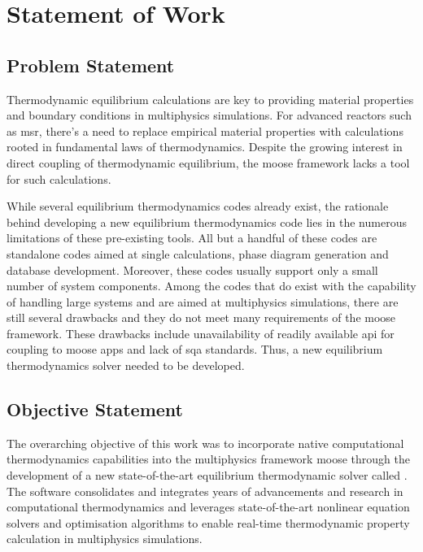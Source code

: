 \chapter{Statement of Work} \label{chap:overview}
	
\section{Problem Statement}
    Thermodynamic equilibrium calculations are key to providing material properties and boundary conditions in multiphysics simulations. For advanced reactors such as \gls{msr}, there's a need to replace empirical material properties with calculations rooted in fundamental laws of thermodynamics.  Despite the growing interest in direct coupling of thermodynamic equilibrium, the \gls{moose} framework lacks a tool for such calculations.

    While several equilibrium thermodynamics codes already exist, the rationale behind developing a new equilibrium thermodynamics code lies in the numerous limitations of these pre-existing tools. All but a handful of these codes are standalone codes aimed at single calculations, phase diagram generation and database development. Moreover, these codes usually support only a small number of system components. Among the codes that do exist with the capability of handling large systems and are aimed at multiphysics simulations, there are still several drawbacks and they do not meet many requirements of the \gls{moose} framework. These drawbacks include unavailability of readily available \gls{api} for coupling to \gls{moose} apps and lack of \gls{sqa} standards. Thus, a new equilibrium thermodynamics solver needed to be developed.

\section{Objective Statement}
    The overarching objective of this work was to incorporate native computational thermodynamics capabilities into the multiphysics framework \gls{moose} through the development of a new state-of-the-art equilibrium thermodynamic solver called \GEM. The software consolidates and integrates years of advancements and research in computational thermodynamics and leverages state-of-the-art nonlinear equation solvers and optimisation algorithms to enable real-time thermodynamic property calculation in multiphysics simulations. 

